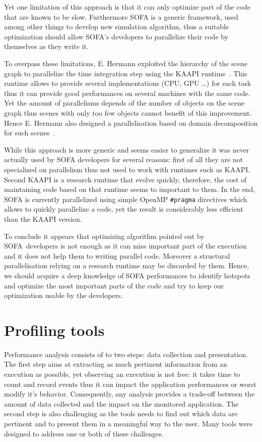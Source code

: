 Yet one limitation of this approach is that it can only optimize part of the
code that are known to be slow. Furthermore \gls{SOFA} is a generic framework,
used among other things to develop new simulation algorithm, thus a suitable
optimization should allow \gls{SOFA}'s developers to parallelize their code by
themselves as they write it.

To overpass these limitations, E. Hermann exploited the hierarchy of the scene
graph to parallelize the time integration step using the \gls{KAAPI}
runtime~\cite{Gautier07KAAPI}. This runtime allows to provide several
implementations (\gls{CPU}, \gls{GPU} \ldots) for each task thus it can
provide good performances on several machines with the same code. Yet the
amount of parallelisms depends of the number of objects on the scene graph
thus scenes with only too few objects cannot benefit of this improvement.
Hence E. Hermann also designed a parallelisation based on domain decomposition
for such scenes~\cite{Hermann09Interactive}.

While this approach is more generic and seems easier to generalize it was
never actually used by \gls{SOFA} developers for several reasons: first of all
they are not specialized on parallelism thus not used to work with runtimes
such as \gls{KAAPI}. Second \gls{KAAPI} is a research runtime that evolve
quickly, therefore, the cost of maintaining code based on that runtime seems
to important to them. In the end, \gls{SOFA} is currently parallelized using
simple \gls{OpenMP} \texttt{\#pragma} directives which allows to quickly
parallelize a code, yet the result is considerably less efficient than the
\gls{KAAPI} version.

To conclude it appears that optimizing algorithm pointed out by
\gls{SOFA} developers is not enough as it can miss important part of the
execution and it does not help them to writing parallel code. Moreover
a structural parallelisation relying on a research runtime may be discarded by
them. Hence, we should acquire a deep knowledge of \gls{SOFA}
performances to identify hotspots and optimize the most important parts of
the code and try to keep our optimization usable by the developers.

\section{Profiling tools}
\label{sec:prof-tools}

Performance analysis consists of to two steps: data collection and
presentation. The first step aims at extracting as much pertinent information
from an execution as possible, yet observing an execution is not free: it
takes time to count and record events thus it can impact the application
performances or worst modify it's behavior. Consequently, any analysis
provides
a trade-off between the amount of data collected and the impact on the
monitored application.  The second step is also challenging as the tools needs
to find out which data are pertinent and to present them in a meaningful way
to the user.  Many tools were designed to address one or both of these
challenges.

